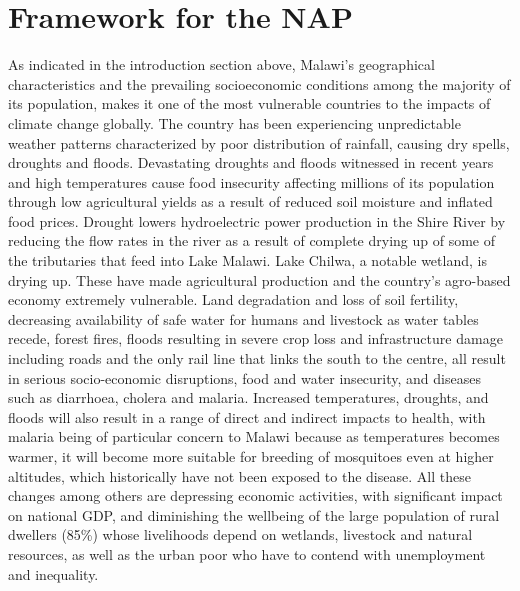 \documentclass[
]{book}
\begin{document}
\hypertarget{framework-for-the-nap}{%
\chapter{Framework for the NAP}\label{framework-for-the-nap}}

As indicated in the introduction section above, Malawi's geographical characteristics and the prevailing socioeconomic conditions among the majority of its population, makes it one of the most vulnerable countries to the impacts of climate change globally. The country has been experiencing unpredictable weather patterns characterized by poor distribution of rainfall, causing dry spells, droughts and floods. Devastating droughts and floods witnessed in recent years and high temperatures cause food insecurity affecting millions of its population through low agricultural yields as a result of reduced soil moisture and inflated food prices. Drought lowers hydroelectric power production in the Shire River by reducing the flow rates in the river as a result of complete drying up of some of the tributaries that feed into Lake Malawi. Lake Chilwa, a notable wetland, is drying up. These have made agricultural production and the country's agro-based economy extremely vulnerable. Land degradation and loss of soil fertility, decreasing availability of safe water for humans and livestock as water tables recede, forest fires, floods resulting in severe crop loss and infrastructure damage including roads and the only rail line that links the south to the centre, all result in serious socio-economic disruptions, food and water insecurity, and diseases such as diarrhoea, cholera and malaria. Increased temperatures, droughts, and floods will also result in a range of direct and indirect impacts to health, with malaria being of particular concern to Malawi because as temperatures becomes warmer, it will become more suitable for breeding of mosquitoes even at higher altitudes, which historically have not been exposed to the disease. All these changes among others are depressing economic activities, with significant impact on national GDP, and diminishing the wellbeing of the large population of rural dwellers (85\%) whose livelihoods depend on wetlands, livestock and natural resources, as well as the urban poor who have to contend with unemployment and inequality.
\end{document}
